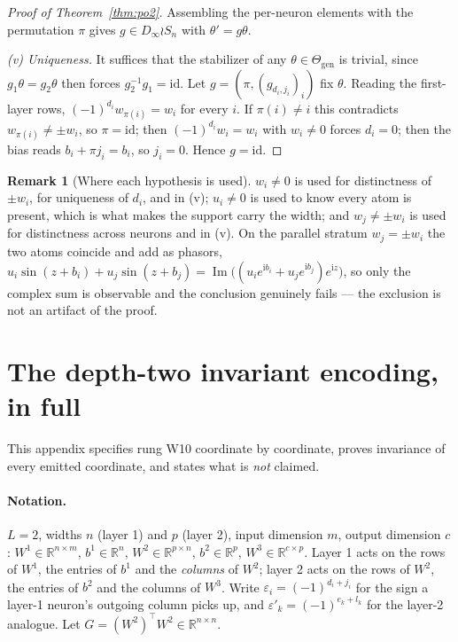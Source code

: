 \documentclass[10pt,letterpaper]{article}
\theoremstyle{definition}
\newtheorem{remark}[theorem]{Remark}
\newcommand{\R}{\mathbb{R}}
\newcommand{\Dinf}{D_\infty}
\newcommand{\Thgen}{\Theta_{\mathrm{gen}}}
\begin{document}
\begin{proof}[Proof of Theorem~\ref{thm:po2}]
Assembling the per-neuron elements with the permutation $\pi$ gives $g \in \Dinf \wr S_n$ with
$\theta' = g\theta$.

\emph{(v) Uniqueness.} It suffices that the stabilizer of any $\theta \in \Thgen$ is trivial, since
$g_1\theta = g_2\theta$ then forces $g_2^{-1}g_1 = \mathrm{id}$. Let $g = (\pi, (g_{d_i,j_i})_i)$
fix $\theta$. Reading the first-layer rows, $(-1)^{d_i} w_{\pi(i)} = w_i$ for every $i$. If
$\pi(i) \neq i$ this contradicts $w_{\pi(i)} \neq \pm w_i$, so $\pi = \mathrm{id}$; then
$(-1)^{d_i}w_i = w_i$ with $w_i \neq 0$ forces $d_i = 0$; then the bias reads
$b_i + \pi j_i = b_i$, so $j_i = 0$. Hence $g = \mathrm{id}$.
\end{proof}

\begin{remark}[Where each hypothesis is used]
$w_i \neq 0$ is used for distinctness of $\pm w_i$, for uniqueness of $d_i$, and in (v);
$u_i \neq 0$ is used to know every atom is present, which is what makes the support carry the
width; and $w_j \neq \pm w_i$ is used for distinctness across neurons and in (v). On the parallel
stratum $w_j = \pm w_i$ the two atoms coincide and add as phasors,
$u_i\sin(z+b_i) + u_j\sin(z+b_j) = \operatorname{Im}\big((u_ie^{\mathrm i b_i}
+ u_je^{\mathrm i b_j})e^{\mathrm i z}\big)$, so only the complex sum is observable and the
conclusion genuinely fails --- the exclusion is not an artifact of the proof.
\end{remark}

\section{The depth-two invariant encoding, in full}\label{app:w10}

This appendix specifies rung W10 coordinate by coordinate, proves invariance of every emitted
coordinate, and states what is \emph{not} claimed.

\paragraph{Notation.} $L=2$, widths $n$ (layer 1) and $p$ (layer 2), input dimension $m$, output
dimension $c$: $W^1 \in \R^{n\times m}$, $b^1 \in \R^n$, $W^2 \in \R^{p\times n}$, $b^2 \in \R^p$,
$W^3 \in \R^{c\times p}$. Layer 1 acts on the rows of $W^1$, the entries of $b^1$ and the
\emph{columns} of $W^2$; layer 2 acts on the rows of $W^2$, the entries of $b^2$ and the columns of
$W^3$. Write $\varepsilon_i = (-1)^{d_i + j_i}$ for the sign a layer-1 neuron's outgoing column
picks up, and $\varepsilon'_k = (-1)^{e_k + l_k}$ for the layer-2 analogue. Let
$G = (W^2)^\top W^2 \in \R^{n \times n}$.
\end{document}
